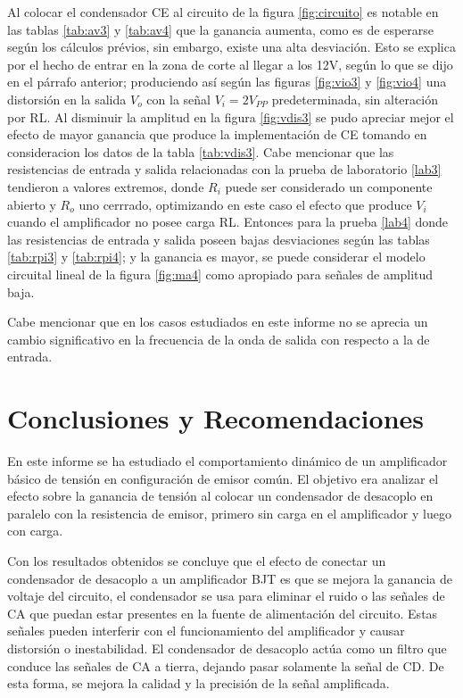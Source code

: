 \documentclass[12pt, a4paper]{article}
\begin{document}
    Al colocar el condensador CE al circuito de la figura \ref{fig:circuito} es notable en las tablas \ref{tab:av3} y \ref{tab:av4} que la ganancia aumenta, como es de esperarse según los cálculos prévios, sin embargo, existe una alta desviación. Esto se explica por el hecho de entrar en la zona de corte al llegar a los 12V, según lo que se dijo en el párrafo anterior; produciendo así según las figuras \ref{fig:vio3} y \ref{fig:vio4} una distorsión en la salida $V_o$ con la señal $V_i = 2V_{PP}$ predeterminada, sin alteración por RL. Al disminuir la amplitud en la figura \ref{fig:vdis3} se pudo apreciar mejor el efecto de mayor ganancia que produce la implementación de CE tomando en consideracion los datos de la tabla \ref{tab:vdis3}. Cabe mencionar que las resistencias de entrada y salida relacionadas con la prueba de laboratorio \ref{lab3} tendieron a valores extremos, donde $R_i$ puede ser considerado un componente abierto y $R_o$ uno cerrrado, optimizando en este caso el efecto que produce $V_i$ cuando el amplificador no posee carga RL. Entonces para la prueba \ref{lab4} donde las resistencias de entrada y salida poseen bajas desviaciones según las tablas \ref{tab:rpi3} y \ref{tab:rpi4}; y la ganancia es mayor, se puede considerar el modelo circuital lineal de la figura \ref{fig:ma4} como apropiado para señales de amplitud baja.

    Cabe mencionar que en los casos estudiados en este informe no se aprecia un cambio significativo en la frecuencia de la onda de salida con respecto a la de entrada.

    \newpage

    \section{Conclusiones y Recomendaciones}

    En este informe se ha estudiado el comportamiento dinámico de un amplificador básico de tensión en configuración de emisor común. El objetivo era analizar el efecto sobre la ganancia de tensión al colocar un condensador de desacoplo en paralelo con la resistencia de emisor, primero sin carga en el amplificador y luego con carga.

    Con los resultados obtenidos se concluye que el efecto de conectar un condensador de desacoplo a un amplificador BJT es que se mejora la ganancia de voltaje del circuito, el condensador se usa para eliminar el ruido o las señales de CA que puedan estar presentes en la fuente de alimentación del circuito. Estas señales pueden interferir con el funcionamiento del amplificador y causar distorsión o inestabilidad. El condensador de desacoplo actúa como un filtro que conduce las señales de CA a tierra, dejando pasar solamente la señal de CD. De esta forma, se mejora la calidad y la precisión de la señal amplificada.
    
\end{document}
